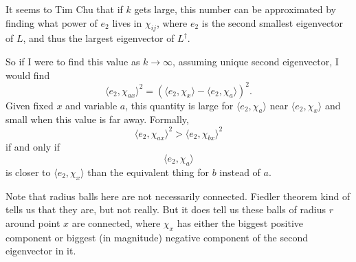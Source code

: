 It seems to Tim Chu that if $k$ gets large, this number can be
approximated by finding what power of $e_2$ lives in $\chi_{ij}$, where $e_2$ is the
second smallest eigenvector of $L$, and thus the largest
eigenvector of $L^\dag$. 

So if I were to find this value as $k \rightarrow \infty$,
assuming unique second eigenvector, I would find
\[ \langle e_2, \chi_{ax}\rangle^2 = \left(\langle e_2, \chi_x\rangle - \langle e_2,
    \chi_a\rangle\right)^2. \]
Given fixed $x$ and variable $a$, this quantity is large for
$\langle e_2, \chi_a\rangle$ near $\langle e_2, \chi_x\rangle$ and small when this value is
far away. Formally, 
\[ \langle e_2, \chi_{ax} \rangle^2 > \langle e_2, \chi_{bx}
\rangle^2 \]
if and only if
\[ \langle e_2, \chi_{a} \rangle \] is closer to
$\langle e_2, \chi_x \rangle$ than the equivalent thing for $b$ instead of $a$. 

Note that radius balls here are not necessarily connected.
Fiedler theorem kind of tells us that they are, but not really.
But it does tell us these balls of radius $r$ around point $x$
are connected, where $\chi_x$ has either the biggest positive
component or biggest (in magnitude) negative component of the
second eigenvector in it.


